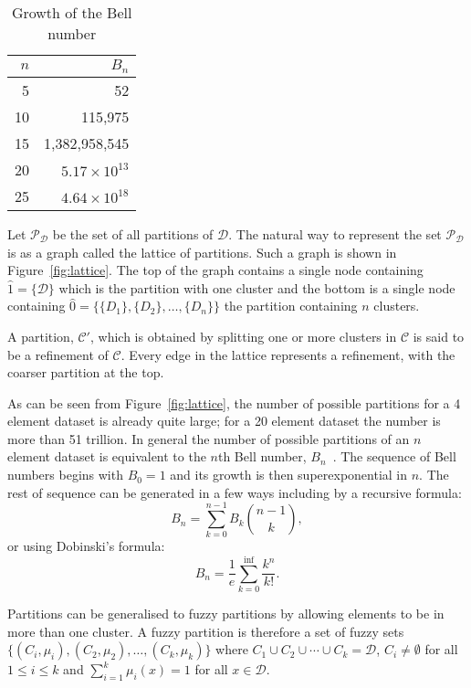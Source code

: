 \documentclass[a4paper]{report}
\newcommand{\dset}{\mathcal{D}}
\newcommand{\clus}{\mathcal{C}}
\begin{document}
\begin{table}
  \centering
  \begin{tabular}{rr}
    \toprule
    $n$ & $B_n$ \\
    \midrule
    5 & 52 \\
    10 & 115,975 \\
    15 & 1,382,958,545 \\
    20 & $5.17 \times 10^{13}$ \\
    25 & $4.64 \times 10^{18}$ \\
    \bottomrule
  \end{tabular}
  \caption{Growth of the Bell number}
  \label{tab:bell-number}
\end{table}

Let $\mathcal{P}_{\dset}$ be the set of all partitions of $\dset$.  The
natural way to represent the set $\mathcal{P}_{\dset}$ is as a graph called
the lattice of partitions.  Such a graph is shown in Figure~\ref{fig:lattice}.
The top of the graph contains a single node containing $\hat{1} = \{\dset\}$
which is the partition with one cluster and the bottom is a single node
containing $\hat{0} = \{\{D_1\},\{D_2\},\dotsc,\{D_n\}\}$ the partition
containing $n$ clusters.

A partition, $\clus'$, which is obtained by splitting one or more clusters in
$\clus$ is said to be a refinement of $\clus$.  Every edge in the lattice
represents a refinement, with the coarser partition at the top.

As can be seen from Figure~\ref{fig:lattice}, the number of possible
partitions for a 4 element dataset is already quite large; for a 20 element
dataset the number is more than 51 trillion.  In general the number of
possible partitions of an $n$ element dataset is equivalent to the $n$th Bell
number, $B_n$~\citep{bell1934exponential}.  The sequence of Bell numbers
begins with $B_0 = 1$ and its growth is then superexponential in $n$.  The
rest of sequence can be generated in a few ways including by a recursive
formula:
\begin{equation*}
  B_n = \sum_{k=0}^{n-1} B_k {n-1 \choose k},
\end{equation*}
or using Dobinski's formula:
\begin{equation*}
  B_n = \frac{1}{e} \sum_{k=0}^{\inf} \frac{k^n}{k!}.
\end{equation*}

Partitions can be generalised to fuzzy partitions by allowing elements to be
in more than one cluster.  A fuzzy partition is therefore a set of fuzzy sets
$\{(C_i,\mu_i),(C_2,\mu_2),\dotsc,(C_k,\mu_k)\}$ where $C_1 \cup C_2 \cup
\dotsb \cup C_k = \dset$, $C_i \neq \emptyset$ for all $1 \leq i \leq k$ and
$\sum_{i=1}^{k} \mu_i(x) = 1$ for all $x \in \dset$.
\end{document}
